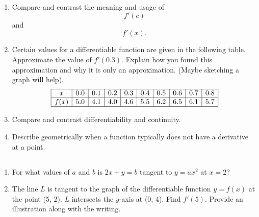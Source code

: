 \chapter{}\section{}

\begin{enumerate}%

\item  Compare and contrast the meaning and usage of $$f'(c)$$ and $$f'(x).$$

\item  Certain values for a differentiable function are given in the following table.  Approximate the value of $f'(0.3).$  Explain how you found this approximation and why it is only an approximation.  (Maybe sketching a graph will help).
$$\begin{array}{|c|c|c|c|c|c|c|c|c|c|}\hline  x & 0.0 & 0.1 & 0.2 & 0.3 & 0.4 & 0.5 & 0.6 & 0.7 & 0.8  \cr \hline  f(x) & 5.0 & 4.1 & 4.0 & 4.6 & 5.5 & 6.2 & 6.5 & 6.1 & 5.7  \cr \hline  \end{array}$$

\item  Compare and contrast differentiability and continuity.

\item  Describe geometrically when a function typically does not have a derivative at a point.   \cite{FWG}


\end{enumerate}
\section{}
\begin{enumerate}%

\item  For what values of $a$ and $b$ is $2x + y = b$ tangent to $y = ax^2$ at $x = 2$?  

\item  The line $L$ is tangent to the graph of the differentiable function $y = f(x)$ at the point (5, 2).  $L$ intersects the $y$-axis at (0, 4).  Find $f'(5).$  Provide an illustration along with the writing.






\end{enumerate}
